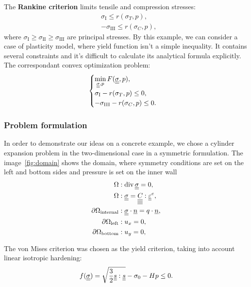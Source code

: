 \documentclass[12pt]{article}
\begin{document}
The \textbf{Rankine criterion} limits tensile and compression stresses:
\begin{align*}
    & \sigma_\text{I} \leq r(\sigma_T, p), \\
    & -\sigma_\text{III} \leq r(\sigma_C, p),
\end{align*}
where $\sigma_\text{I} \geq \sigma_\text{II} \geq \sigma_\text{III}$ are principal stresses. By this example, we can consider a case of plasticity model, where yield function isn't a simple inequality. It contains several constraints and it's difficult to calculate its analytical formula explicitly. The correspondant convex optimization problem:
\begin{equation*}
    \begin{cases}
        \min\limits_{\underline{\underline{\sigma}}, p} F(\underline{\underline{\sigma}}, p), \\
        \sigma_\text{I} - r(\sigma_T, p) \leq 0, \\
        -\sigma_\text{III} - r(\sigma_C, p) \leq 0.    
    \end{cases}
\end{equation*}

\subsubsection{Problem formulation}
\label{sec:theory:problem_formulation}

In order to demonstrate our ideas on a concrete example, we chose a cylinder expansion problem in the two-dimensional case in a symmetric formulation. The image~\ref{fig:domain} shows the domain, where symmetry conditions are set on the left and bottom sides and pressure is set on the inner wall
\begin{align}
    \Omega &: \operatorname{div} \underline{\underline{\sigma}} = 0 ,\label{eqn:cylinder_div}\\
    \Omega &: \underline{\underline{\sigma}} = \underline{\underline{\underline{\underline{C_{}}}}} : \underline{\underline{\varepsilon}}^e, \\
    \partial\Omega_\text{internal} &: \underline{\underline{\sigma}} \cdot \underline{n} = q \cdot \underline{n}, \\
    \partial\Omega_\text{left} &: u_x = 0, \\
    \partial\Omega_\text{bottom} &: u_y = 0, \label{eqn:cylinder_bc}
\end{align}

The von Mises criterion was chosen as the yield criterion, taking into account linear isotropic hardening:
\begin{equation}\label{eqn:cylinder_von_mises}
    f(\underline{\underline{\sigma}}) = \sqrt{\frac{3}{2} \underline{\underline{s}} : \underline{\underline{s}}} - \sigma_0 - Hp \leq 0.
\end{equation}
\end{document}
